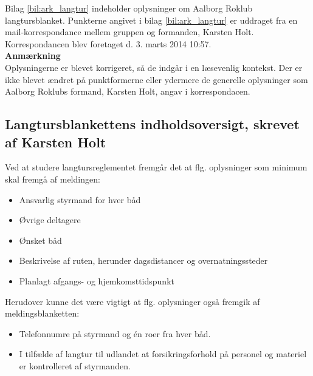 \label{bil:ark_langtur}
Bilag \ref{bil:ark_langtur} indeholder oplysninger om Aalborg Roklub langtursblanket. Punkterne angivet i bilag \ref{bil:ark_langtur} er uddraget fra en mail-korrespondance mellem gruppen og formanden, Karsten Holt. Korrespondancen blev foretaget d. 3. marts 2014 10:57. \\

{\bf Anmærkning}\\
Oplysningerne er blevet korrigeret, så de indgår i en læsevenlig kontekst. Der er ikke blevet ændret på punktformerne eller ydermere de generelle oplysninger som Aalborg Roklubs formand, Karsten Holt, angav i korrespondacen.

\subsection*{Langtursblankettens indholdsoversigt, skrevet af Karsten Holt}
Ved at studere langtursreglementet fremgår det at flg. oplysninger som minimum skal fremgå af meldingen:
\begin{itemize}
    \item Ansvarlig styrmand for hver båd
    \item Øvrige deltagere
    \item Ønsket båd
    \item Beskrivelse af ruten, herunder dagsdistancer og overnatningssteder
    \item Planlagt afgangs- og hjemkomsttidspunkt
\end{itemize}

Herudover kunne det være vigtigt at flg. oplysninger også fremgik af meldingsblanketten:
\begin{itemize}
    \item Telefonnumre på styrmand og én roer fra hver båd.
    \item I tilfælde af langtur til udlandet at forsikringsforhold på personel og materiel er kontrolleret af styrmanden.
\end{itemize}
